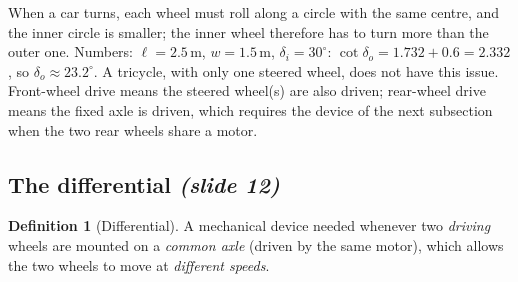 \documentclass[11pt,a4paper]{article}
\theoremstyle{definition}
\newtheorem{definition}{Definition}[section]
\theoremstyle{plain}
\newtheorem{proposition}[definition]{Proposition}
\begin{document}

\begin{intuition}
When a car turns, each wheel must roll along a circle with the same centre, and the inner circle is smaller; the inner wheel therefore has to turn more than the outer one. Numbers: $\ell=2.5$\,m, $w=1.5$\,m, $\delta_i=30^\circ$: $\cot\delta_o=1.732+0.6=2.332$, so $\delta_o\approx23.2^\circ$. A tricycle, with only one steered wheel, does not have this issue. Front-wheel drive means the steered wheel(s) are also driven; rear-wheel drive means the fixed axle is driven, which requires the device of the next subsection when the two rear wheels share a motor.
\end{intuition}

\subsection{The differential \emph{(slide 12)}}

\begin{definition}[Differential]
A mechanical device needed whenever two \emph{driving} wheels are mounted on a \emph{common axle} (driven by the same motor), which allows the two wheels to move at \emph{different speeds}.
\end{definition}
\end{document}
